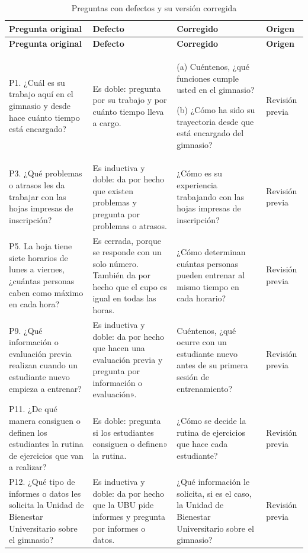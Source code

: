 \documentclass[12pt,a4paper]{article}
\begin{document}
\begingroup\small\setlength{\tabcolsep}{4pt}
\begin{longtable}{>{\raggedright\arraybackslash}p{4.2cm} >{\raggedright\arraybackslash}p{3.4cm} >{\raggedright\arraybackslash}p{5.2cm} >{\raggedright\arraybackslash}p{1.9cm}}
\caption{Preguntas con defectos y su versión corregida}\\
\rowcolor{lilaP}\textbf{Pregunta original} & \textbf{Defecto} & \textbf{ Corregido} & \textbf{Origen} \\
\endfirsthead
\rowcolor{lilaP}\textbf{Pregunta original} & \textbf{Defecto} & \textbf{Corregido} & \textbf{Origen} \\
\endhead
\rowcolor{lilaS}P1. ¿Cuál es su trabajo aquí en el gimnasio y desde hace cuánto tiempo está encargado? & Es doble: pregunta por su trabajo y por cuánto tiempo lleva a cargo. & (a) Cuéntenos, ¿qué funciones cumple usted en el gimnasio?\par\smallskip (b) ¿Cómo ha sido su trayectoria desde que está encargado del gimnasio? & Revisión previa \\
\rowcolor{white}P3. ¿Qué problemas o atrasos les da trabajar con las hojas impresas de inscripción? & Es inductiva y doble: da por hecho que existen problemas y pregunta por problemas o atrasos. & ¿Cómo es su experiencia trabajando con las hojas impresas de inscripción? & Revisión previa \\
\rowcolor{lilaS}P5. La hoja tiene siete horarios de lunes a viernes, ¿cuántas personas caben como máximo en cada hora? & Es cerrada, porque se responde con un solo número. También da por hecho que el cupo es igual en todas las horas. & ¿Cómo determinan cuántas personas pueden entrenar al mismo tiempo en cada horario? & Revisión previa \\
\rowcolor{white}P9. ¿Qué información o evaluación previa realizan cuando un estudiante nuevo empieza a entrenar? & Es inductiva y doble: da por hecho que hacen una evaluación previa y pregunta por información o evaluación». & Cuéntenos, ¿qué ocurre con un estudiante nuevo antes de su primera sesión de entrenamiento? & Revisión previa \\
\rowcolor{lilaS}P11. ¿De qué manera consiguen o definen los estudiantes la rutina de ejercicios que van a realizar? & Es doble: pregunta si los estudiantes consiguen o definen» la rutina. & ¿Cómo se decide la rutina de ejercicios que hace cada estudiante? & Revisión previa \\
\rowcolor{white}P12. ¿Qué tipo de informes o datos les solicita la Unidad de Bienestar Universitario sobre el gimnasio? & Es inductiva y doble: da por hecho que la UBU pide informes y pregunta por informes o datos. & ¿Qué información le solicita, si es el caso, la Unidad de Bienestar Universitario sobre el gimnasio? & Revisión previa \\

\end{longtable}
\end{document}
